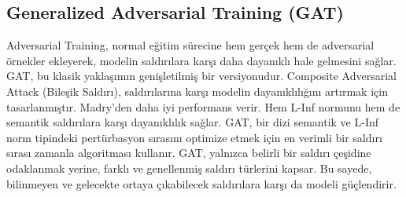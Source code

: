 \newpage

\subsection{Generalized Adversarial Training (GAT)}

Adversarial Training, normal eğitim sürecine hem gerçek hem de adversarial örnekler ekleyerek, modelin saldırılara karşı daha dayanıklı hale gelmesini sağlar. GAT, bu klasik yaklaşımın genişletilmiş bir versiyonudur. Composite Adversarial Attack (Bileşik Saldırı), saldırılarına karşı modelin dayanıklılığını artırmak için tasarlanmıştır. Madry'den daha iyi performans verir. Hem L-Inf normunu hem de semantik saldırılara karşı dayanıklılık sağlar. GAT, bir dizi semantik ve L-Inf norm tipindeki pertürbasyon sırasını optimize etmek için en verimli bir saldırı sırası zamanla algoritması kullanır. GAT, yalnızca belirli bir saldırı çeşidine odaklanmak yerine, farklı ve genellenmiş saldırı türlerini kapsar. Bu sayede, bilinmeyen ve gelecekte ortaya çıkabilecek saldırılara karşı da modeli güçlendirir.

\newpage